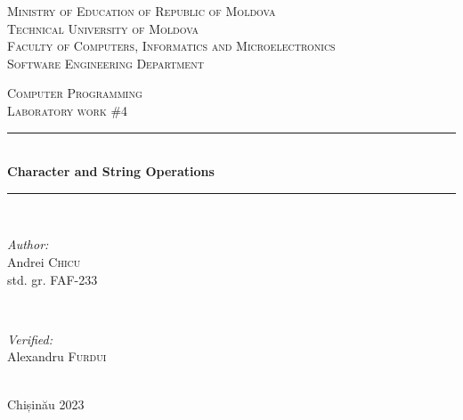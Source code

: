 \documentclass[12pt]{article}
\begin{document}
\begin{titlepage}
   \begin{center}
    \textsc{\large Ministry of Education of Republic of Moldova}\\[0.5cm]
    \textsc{\large Technical University of Moldova}\\[0.5cm]
    \textsc{\large Faculty of Computers, Informatics and Microelectronics}\\[0.5cm]
    \textsc{\large Software Engineering Department}\\[1.2cm]
    
    \vspace{25 mm}
    
    \textsc{\Large Computer Programming}\\[0.5cm]
    \textsc{\large Laboratory work \#4}\\[0.5cm]    %
    
    \newcommand{\HRule}{\rule{\linewidth}{0.5mm}}
    \vspace{10 mm}
    \HRule \\[0.4cm]
    { \LARGE \bfseries Character and String Operations }\\[0.4cm] %
    \HRule \\[1.5cm]
    
    \vspace{10mm}
    
    \begin{minipage}[t]{0.4\textwidth}
    \begin{flushleft} \large
    \emph{Author:} \\
    Andrei \textsc{Chicu}\\                         %
    std. gr. FAF-233                                %
    \end{flushleft}
    \end{minipage}
    ~
    \begin{minipage}[t]{0.4\textwidth}
    \begin{flushright} \large
    \emph{Verified:} \\
    Alexandru \textsc{Furdui}\\
    \end{flushright}
    \end{minipage}\\[3cm]
    
    \vspace{5 mm}
    \large Chișinău 2023\\[0.5cm]
    
    \vfill
    \end{center}
\end{titlepage}
\end{document}
